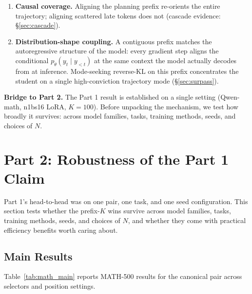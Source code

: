 \documentclass[10pt]{article}
\begin{document}
\begin{enumerate}
\item \textbf{Causal coverage.} Aligning the planning prefix re-orients the entire trajectory; aligning scattered late tokens does not (cascade evidence: \S\ref{sec:cascade}).
\item \textbf{Distribution-shape coupling.} A contiguous prefix matches the autoregressive structure of the model: every gradient step aligns the conditional $p_\theta(y_t \mid y_{<t})$ at the same context the model actually decodes from at inference. Mode-seeking reverse-KL on this prefix concentrates the student on a single high-conviction trajectory mode (\S\ref{sec:surpass}).
\end{enumerate}

\textbf{Bridge to Part 2.} The Part 1 result is established on a single setting (Qwen-math, n1bs16 LoRA, $K{=}100$). Before unpacking the mechanism, we test how broadly it survives: across model families, tasks, training methods, seeds, and choices of $N$.

\section{Part 2: Robustness of the Part 1 Claim}
\label{sec:part2}

Part 1's head-to-head was on one pair, one task, and one seed configuration. This section tests whether the prefix-$K$ wins survive across model families, tasks, training methods, seeds, and choices of $N$, and whether they come with practical efficiency benefits worth caring about.

\subsection{Main Results}
\label{sec:main_results}

Table~\ref{tab:math_main} reports MATH-500 results for the canonical pair across selectors and position settings.
\end{document}
